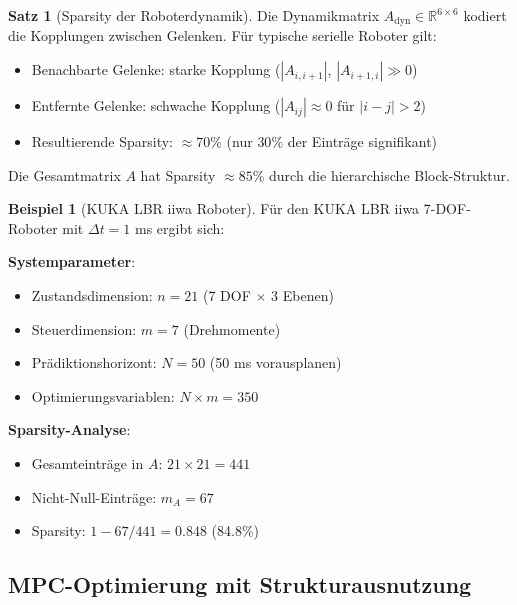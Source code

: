 ﻿\documentclass[a4paper,12pt]{report}
\theoremstyle{definition}
\newtheorem{beispiel}{Beispiel}
\newtheorem{satz}{Satz}
\begin{document}
	\begin{satz}[Sparsity der Roboterdynamik]
		Die Dynamikmatrix $A_{\text{dyn}} \in \mathbb{R}^{6 \times 6}$ kodiert die Kopplungen zwischen Gelenken. Für typische serielle Roboter gilt:
		\begin{itemize}
			\item Benachbarte Gelenke: starke Kopplung ($|A_{i,i+1}|$, $|A_{i+1,i}| \gg 0$)
			\item Entfernte Gelenke: schwache Kopplung ($|A_{ij}| \approx 0$ für $|i-j| > 2$)
			\item Resultierende Sparsity: $\approx 70\%$ (nur $30\%$ der Einträge signifikant)
		\end{itemize}
		
		Die Gesamtmatrix $A$ hat Sparsity $\approx 85\%$ durch die hierarchische Block-Struktur.
	\end{satz}
	
	\begin{beispiel}[KUKA LBR iiwa Roboter]
		Für den KUKA LBR iiwa 7-DOF-Roboter mit $\Delta t = 1$ ms ergibt sich:
		
		\textbf{Systemparameter}:
		\begin{itemize}
			\item Zustandsdimension: $n = 21$ (7 DOF $\times$ 3 Ebenen)
			\item Steuerdimension: $m = 7$ (Drehmomente)
			\item Prädiktionshorizont: $N = 50$ (50 ms vorausplanen)
			\item Optimierungsvariablen: $N \times m = 350$
		\end{itemize}
		
		\textbf{Sparsity-Analyse}:
		\begin{itemize}
			\item Gesamteinträge in $A$: $21 \times 21 = 441$
			\item Nicht-Null-Einträge: $m_A = 67$
			\item Sparsity: $1 - 67/441 = 0.848$ (84.8\%)
		\end{itemize}
	\end{beispiel}
	
	\subsection{MPC-Optimierung mit Strukturausnutzung}
	
\end{document}
